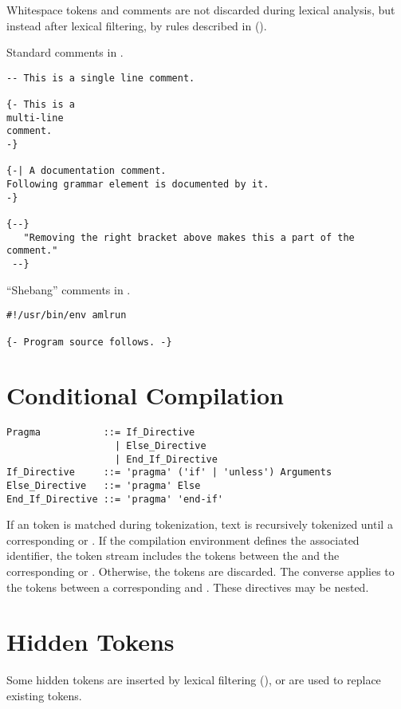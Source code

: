 Whitespace tokens and comments are not discarded during lexical analysis, but instead after lexical filtering, by rules described in ().

\example Standard comments in \Aml.
\begin{lstlisting}[language={Aml},deletekeywords={of}]
-- This is a single line comment.

{- This is a
multi-line 
comment. 
-}
 
{-| A documentation comment.
Following grammar element is documented by it.
-}

{--}
   "Removing the right bracket above makes this a part of the comment."
 --}
\end{lstlisting}

\example ``Shebang'' comments in \Aml. 
\begin{lstlisting}[language={[ExtraComments]Aml}]
#!/usr/bin/env amlrun

{- Program source follows. -}
\end{lstlisting}





\section{Conditional Compilation}
\label{sec:conditional-compilation}

\grammar\begin{lstlisting}[deletekeywords={if,unless}]
Pragma           ::= If_Directive 
                   | Else_Directive 
                   | End_If_Directive 
If_Directive     ::= 'pragma' ('if' | 'unless') Arguments
Else_Directive   ::= 'pragma' Else
End_If_Directive ::= 'pragma' 'end-if'
\end{lstlisting}

If an  token is matched during tokenization, text is recursively tokenized until a corresponding  or . If the compilation environment defines the associated identifier, the token stream includes the tokens between the  and the corresponding  or . Otherwise, the tokens are discarded. The converse applies to the tokens between a corresponding  and . These directives may be nested. 





\section{Hidden Tokens}
\label{sec:hidden-tokens}

Some hidden tokens are inserted by lexical filtering (), or are used to replace existing tokens. 






